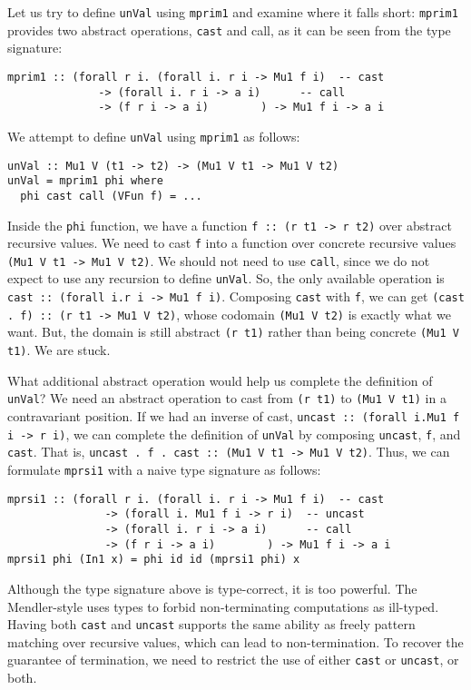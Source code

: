 Let us try to define \lstinline{unVal} using \lstinline{mprim1} and examine
where it falls short: \lstinline{mprim1} provides two abstract operations,
\lstinline{cast} and {call}, as it can be seen from the type signature:
\begin{lstlisting}
mprim1 :: (forall r i. (forall i. r i -> Mu1 f i)  -- cast
              -> (forall i. r i -> a i)      -- call
              -> (f r i -> a i)        ) -> Mu1 f i -> a i
\end{lstlisting}
We attempt to define \lstinline{unVal} using \lstinline{mprim1} as follows:
\begin{lstlisting}
unVal :: Mu1 V (t1 -> t2) -> (Mu1 V t1 -> Mu1 V t2)
unVal = mprim1 phi where
  phi cast call (VFun f) = ...
\end{lstlisting}\vspace*{-1.3ex}
Inside the \lstinline{phi} function, we have a function
\lstinline{f :: (r t1 -> r t2)} over abstract recursive values.
We need to cast \lstinline{f} into a function over concrete recursive values
\lstinline{(Mu1 V t1 -> Mu1 V t2)}.
We should not need to use \lstinline{call}, since we do not expect
to use any recursion to define \lstinline{unVal}.
So, the only available operation is
\lstinline{cast :: (forall i.r i -> Mu1 f i)}.
Composing \lstinline{cast} with \lstinline{f}, we can get
\lstinline{(cast . f) :: (r t1 -> Mu1 V t2)}, whose codomain
\lstinline{(Mu1 V t2)} is exactly what we want. But, the domain
is still abstract \lstinline{(r t1)} rather than being concrete
\lstinline{(Mu1 V t1)}. We are stuck.

What additional abstract operation would help us complete
the definition of \lstinline{unVal}? We need an abstract operation
to cast from \lstinline{(r t1)} to \lstinline{(Mu1 V t1)}
in a contravariant position. If we had an inverse of cast,
\lstinline{uncast :: (forall i.Mu1 f i -> r i)}, we can
complete the definition of \lstinline{unVal} by composing
\lstinline{uncast}, \lstinline{f}, and \lstinline{cast}.
That is, \lstinline{uncast . f . cast :: (Mu1 V t1 -> Mu1 V t2)}.
Thus, we can formulate \lstinline{mprsi1} with a naive type signature
as follows:
\begin{lstlisting}
mprsi1 :: (forall r i. (forall i. r i -> Mu1 f i)  -- cast
               -> (forall i. Mu1 f i -> r i)  -- uncast
               -> (forall i. r i -> a i)      -- call
               -> (f r i -> a i)        ) -> Mu1 f i -> a i
mprsi1 phi (In1 x) = phi id id (mprsi1 phi) x
\end{lstlisting}\vspace*{-1.2ex}
Although the type signature above is type-correct, it is too powerful.
The Mendler-style uses types to forbid non-terminating computations
as ill-typed. Having both \lstinline{cast} and \lstinline{uncast} supports
the same ability as freely pattern matching over recursive values,
which can lead to non-termination. To recover the guarantee of termination,
we need to restrict the use of either \lstinline{cast} or \lstinline{uncast},
or both.

